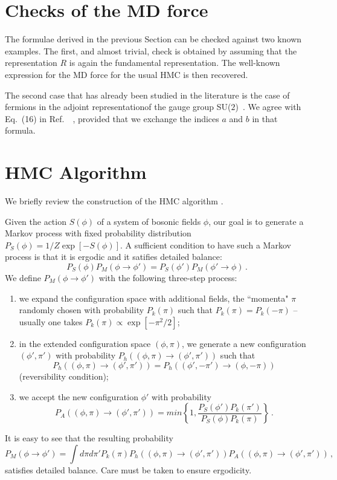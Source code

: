 \documentclass{article}[12pt]
\begin{document}
\section{Checks of the MD force}
The formulae derived in the previous Section can be checked against two
known examples. The first, and almost trivial, check is obtained by
assuming that the representation $R$ is again the fundamental
representation. The well-known expression for the MD force for the
usual HMC is then recovered. 

The second case that has already been studied in the literature is the
case of fermions in the adjoint representationof the gauge group
SU($2$)~\cite{Donini:1996nr}. We agree with Eq.~(16) in
Ref.~~\cite{Donini:1996nr}, provided that we exchange the indices $a$
and $b$ in that formula.

\section{HMC Algorithm}

We briefly review the construction of the HMC algorithm \cite{??}.

Given the action $S(\phi)$ of a system of bosonic fields $\phi$, our goal is to generate a Markov process with 
fixed probability distribution $P_S(\phi) = 1/Z \exp[-S(\phi) ]$. A sufficient condition to have such a 
Markov process is that it is ergodic and it satifies detailed balance:
\begin{equation}
P_S(\phi)P_M(\phi\rightarrow \phi') = P_S(\phi')P_M(\phi' \rightarrow \phi) \, .
\end{equation}
We define $P_M(\phi \rightarrow \phi')$ with the following three-step process:
\begin{enumerate}
\item we expand the configuration space with additional fields, the ``momenta" $\pi$ randomly chosen with probability
$P_k(\pi)$ such that $P_k(\pi)=P_k(-\pi)$ -- usually one takes $P_k(\pi)\propto \exp[-\pi^2/2]$; 
\item in the extended configuration space $(\phi, \pi)$, we generate a new configuration $(\phi',\pi')$ with probability
$P_h((\phi,\pi)\rightarrow(\phi',\pi'))$ such that 
\[P_h((\phi,\pi)\rightarrow(\phi',\pi')) = P_h((\phi',-\pi')\rightarrow(\phi,-\pi))\]
(reversibility condition);
\item we accept the new configuration $\phi'$ with probability 
\[P_A((\phi,\pi)\rightarrow(\phi',\pi')) = min \left\{ 1, \frac{P_S(\phi')P_k(\pi')}{P_S(\phi)P_k(\pi)} \right\} \, .\]
\end{enumerate}
It is easy to see that the resulting probability
\begin{equation}
P_M(\phi\rightarrow\phi') = \int d\pi d\pi' P_k(\pi) P_h((\phi,\pi)\rightarrow(\phi',\pi')) P_A((\phi,\pi)\rightarrow(\phi',\pi')) \, ,
\end{equation}
satisfies detailed balance. Care must be taken to ensure ergodicity.
\end{document}
